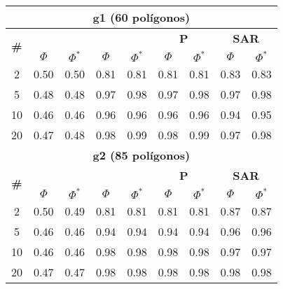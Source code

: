 \begin{table}
\begin{small}
		\bigskip
		\begin{tabular}{|c|cc|cc|cc|cc|}
			\hline
			\multicolumn{9}{|c|}{\textbf{g1 (60 pol\'igonos)}}\\
			\hline			
			\multirow{2}{*}{\textbf{\#}} &
			\multicolumn{2}{c|}{\textbf{\astar}} &
			\multicolumn{2}{c|}{\textbf{\ambush}} &
			\multicolumn{2}{c|}{\textbf{P}} &
			\multicolumn{2}{c|}{\textbf{SAR}}\\
			& $\Phi$ & $\Phi^*$ & $\Phi$ & $\Phi^*$&
			$\Phi$ & $\Phi^*$& $\Phi$ & $\Phi^*$\\
			\hline
			2 & 0.50 & 0.50 & 0.81 & 0.81 & 0.81 & 0.81 & 0.83 & 0.83\\
			5 & 0.48 & 0.48 & 0.97 & 0.98 & 0.97 & 0.98 & 0.97 & 0.98\\
			10 & 0.46 & 0.46 & 0.96 & 0.96 & 0.96 & 0.96 & 0.94 & 0.95\\
			20 & 0.47 & 0.48 & 0.98 & 0.99 & 0.98 & 0.99 & 0.97 & 0.98\\
			\hline
			\multicolumn{9}{|c|}{\textbf{g2 (85 pol\'igonos)}}\\
			\hline
			\multirow{2}{*}{\textbf{\#}} &
			\multicolumn{2}{c|}{\textbf{\astar}} &
			\multicolumn{2}{c|}{\textbf{\ambush}} &
			\multicolumn{2}{c|}{\textbf{P}} &
			\multicolumn{2}{c|}{\textbf{SAR}}\\
			& $\Phi$ & $\Phi^*$ & $\Phi$ & $\Phi^*$&
			$\Phi$ & $\Phi^*$& $\Phi$ & $\Phi^*$\\
			\hline
			2 & 0.50 & 0.49 & 0.81 & 0.81 & 0.81 & 0.81 & 0.87 & 0.87\\
			5 & 0.46 & 0.46 & 0.94 & 0.94 & 0.94 & 0.94 & 0.96 & 0.96\\
			10 & 0.46 & 0.46 & 0.98 & 0.98 & 0.98 & 0.98 & 0.97 & 0.97\\
			20 & 0.47 & 0.47 & 0.98 & 0.98 & 0.98 & 0.98 & 0.98 & 0.98\\
			\hline
		\end{tabular}
	\end{small}
\end{table}